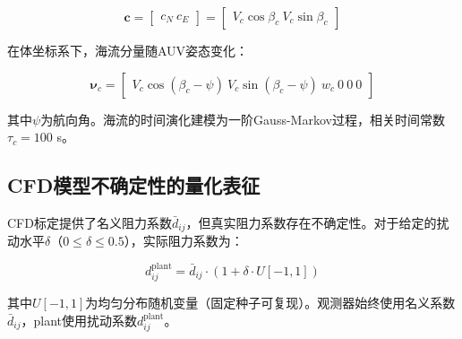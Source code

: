 \begin{equation}
    \bm{c} = \begin{bmatrix} c_N \ c_E \end{bmatrix} = \begin{bmatrix} V_c\cos\beta_c \ V_c\sin\beta_c \end{bmatrix}
    \label{eq:current_ned}
\end{equation}

在体坐标系下，海流分量随AUV姿态变化：

\begin{equation}
    \bm{\nu}_c = \begin{bmatrix} V_c\cos(\beta_c-\psi) \ V_c\sin(\beta_c-\psi) \ w_c \ 0 \ 0 \ 0 \end{bmatrix}
    \label{eq:current_body}
\end{equation}

其中$\psi$为航向角。海流的时间演化建模为一阶Gauss-Markov过程，相关时间常数$\tau_c=100$ s。

\subsection{CFD模型不确定性的量化表征}

CFD标定提供了名义阻力系数$\bar{d}_{ij}$，但真实阻力系数存在不确定性。对于给定的扰动水平$\delta$（$0\le\delta\le 0.5$），实际阻力系数为：

\begin{equation}
    d_{ij}^{\text{plant}} = \bar{d}_{ij} \cdot (1 + \delta \cdot U[-1,1])
    \label{eq:mismatch}
\end{equation}

其中$U[-1,1]$为均匀分布随机变量（固定种子可复现）。观测器始终使用名义系数$\bar{d}_{ij}$，plant使用扰动系数$d_{ij}^{\text{plant}}$。
